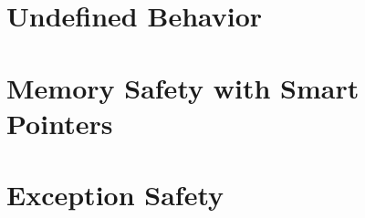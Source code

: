 \documentclass{article}
\title{\thistitle}
\author{\me}
\date{\today}
\begin{document}
\maketitle
\tableofcontents
\pagebreak

\section{Undefined Behavior}

\section{Memory Safety with Smart Pointers}

\section{Exception Safety}
\end{document}
